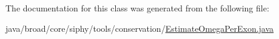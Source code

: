 The documentation for this class was generated from the following file\+:\begin{DoxyCompactItemize}
\item 
java/broad/core/siphy/tools/conservation/\hyperlink{_estimate_omega_per_exon_8java}{Estimate\+Omega\+Per\+Exon.\+java}\end{DoxyCompactItemize}
